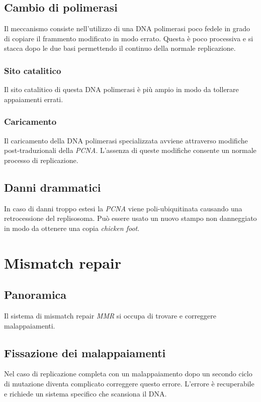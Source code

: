 	\subsection{Cambio di polimerasi}
	Il meccanismo consiste nell'utilizzo di una DNA polimerasi poco fedele in grado di copiare il frammento modificato in modo errato.
	Questa \`e poco processiva e si stacca dopo le due basi permettendo il continuo della normale replicazione.

		\subsubsection{Sito catalitico}
		Il sito catalitico di questa DNA polimerasi \`e pi\`u ampio in modo da tollerare appaiamenti errati.

		\subsubsection{Caricamento}
		Il caricamento della DNA polimerasi specializzata avviene attraverso modifiche post-traduzionali della \emph{PCNA}.
		L'assenza di queste modifiche consente un normale processo di replicazione.

	\subsection{Danni drammatici}
	In caso di danni troppo estesi la \emph{PCNA} viene poli-ubiquitinata causando una retrocessione del replisosoma.
	Pu\`o essere usato un nuovo stampo non danneggiato in modo da ottenere una copia \emph{chicken foot}.

\section{Mismatch repair}

	\subsection{Panoramica}
	Il sistema di mismatch repair \emph{MMR} si occupa di trovare e correggere malappaiamenti.

	\subsection{Fissazione dei malappaiamenti}
	Nel caso di replicazione completa con un malappaiamento dopo un secondo ciclo di mutazione diventa complicato correggere questo errore.
	L'errore \`e recuperabile e richiede un sistema specifico che scansiona il DNA.

